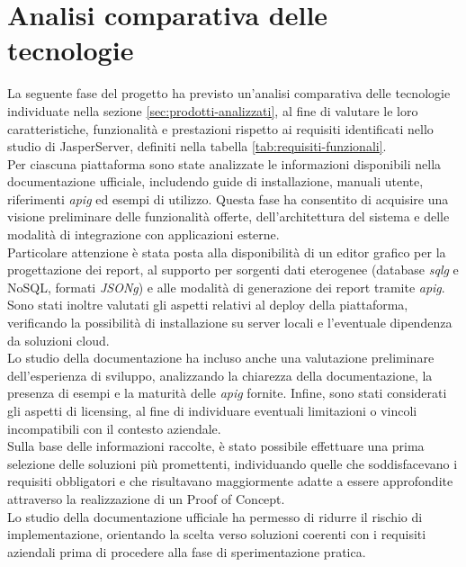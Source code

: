 \section{Analisi comparativa delle tecnologie}
\label{sec:analisi-comparativa-tecnologie}
    La seguente fase del progetto ha previsto un'analisi comparativa delle tecnologie individuate nella sezione \ref{sec:prodotti-analizzati}, al fine di valutare le loro caratteristiche, funzionalità e prestazioni rispetto ai requisiti identificati nello studio di JasperServer, definiti nella tabella \ref{tab:requisiti-funzionali}.\\
    Per ciascuna piattaforma sono state analizzate le informazioni disponibili nella documentazione ufficiale, includendo guide di installazione, manuali utente, riferimenti \emph{\gls{apig}} ed esempi di utilizzo. Questa fase ha consentito di acquisire una visione preliminare delle funzionalità offerte, dell'architettura del sistema e delle modalità di integrazione con applicazioni esterne.\\
    Particolare attenzione è stata posta alla disponibilità di un editor grafico per la progettazione dei report, al supporto per sorgenti dati eterogenee (database \emph{\gls{sqlg}} e NoSQL, formati \emph{\gls{JSONg}}) e alle modalità di generazione dei report tramite \emph{\gls{apig}}. Sono stati inoltre valutati gli aspetti relativi al deploy della piattaforma, verificando la possibilità di installazione su server locali e l'eventuale dipendenza da soluzioni cloud.\\
    Lo studio della documentazione ha incluso anche una valutazione preliminare dell'esperienza di sviluppo, analizzando la chiarezza della documentazione, la presenza di esempi e la maturità delle \emph{\gls{apig}} fornite. Infine, sono stati considerati gli aspetti di licensing, al fine di individuare eventuali limitazioni o vincoli incompatibili con il contesto aziendale.\\
    Sulla base delle informazioni raccolte, è stato possibile effettuare una prima selezione delle soluzioni più promettenti, individuando quelle che soddisfacevano i requisiti obbligatori e che risultavano maggiormente adatte a essere approfondite attraverso la realizzazione di un Proof of Concept.\\
    Lo studio della documentazione ufficiale ha permesso di ridurre il rischio di implementazione, orientando la scelta verso soluzioni coerenti con i requisiti aziendali prima di procedere alla fase di sperimentazione pratica.\\

